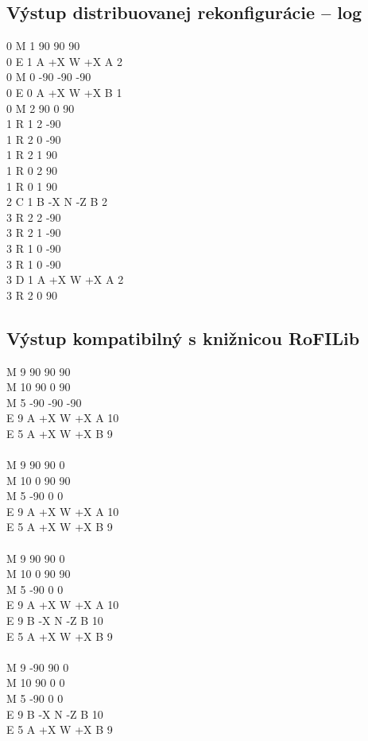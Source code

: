 \documentclass[
  digital, %
  oneside, %
  notable,   %
  lof,     %
  nolot,     %
]{fithesis3}
\begin{document}
\subsection{Výstup distribuovanej rekonfigurácie -- log} 
\label{sec:log}
0 M 1 90 90 90 \\
0 E 1 A +X W +X A 2 \\
0 M 0 -90 -90 -90 \\
0 E 0 A +X W +X B 1 \\
0 M 2 90 0 90 \\
1 R 1 2 -90 \\
1 R 2 0 -90 \\
1 R 2 1 90 \\
1 R 0 2 90 \\
1 R 0 1 90 \\ 
2 C 1 B -X N -Z B 2 \\
3 R 2 2 -90 \\
3 R 2 1 -90 \\
3 R 1 0 -90 \\
3 R 1 0 -90 \\
3 D 1 A +X W +X A 2 \\
3 R 2 0 90 

\subsection{Výstup kompatibilný s knižnicou RoFILib}
M 9 90 90 90 \\
M 10 90 0 90 \\
M 5 -90 -90 -90 \\
E 9 A +X W +X A 10 \\
E 5 A +X W +X B 9 \\
\\
M 9 90 90 0 \\
M 10 0 90 90 \\
M 5 -90 0 0 \\
E 9 A +X W +X A 10 \\
E 5 A +X W +X B 9 \\
\\
M 9 90 90 0 \\
M 10 0 90 90 \\
M 5 -90 0 0 \\
E 9 A +X W +X A 10 \\
E 9 B -X N -Z B 10 \\
E 5 A +X W +X B 9 \\
\\
M 9 -90 90 0 \\
M 10 90 0 0 \\
M 5 -90 0 0 \\
E 9 B -X N -Z B 10 \\
E 5 A +X W +X B 9
\end{document}
